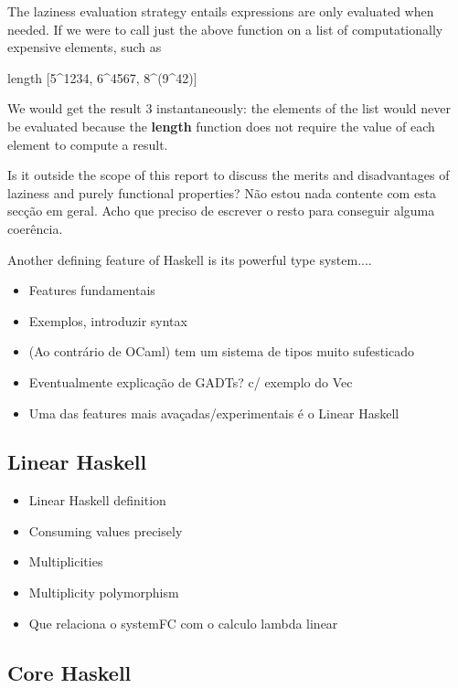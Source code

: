 \documentclass[a4paper, draft]{report}
\begin{document}
The laziness evaluation strategy entails expressions are only evaluated when
needed. If we were to call just the above function on a list of computationally
expensive elements, such as
\begin{code}
    length [5^1234, 6^4567, 8^(9^42)]
\end{code}
We would get the result 3 instantaneously: the elements of the list would never
be evaluated because the \textbf{length} function does not require the value of
each element to compute a result.

Is it outside the scope of this report to discuss the merits and disadvantages
of laziness and purely functional properties? Não estou nada contente com esta
secção em geral. Acho que preciso de escrever o resto para conseguir alguma
coerência.

Another defining feature of Haskell is its powerful type system....


\begin{itemize}
    \item Features fundamentais
    \item Exemplos, introduzir syntax
    \item (Ao contrário de OCaml) tem um sistema de tipos muito sufesticado
    \item Eventualmente explicação de GADTs? c/ exemplo do Vec
    \item Uma das features mais avaçadas/experimentais é o Linear Haskell
\end{itemize}

\subsection{Linear Haskell}

\begin{itemize}
    \item Linear Haskell definition
    \item Consuming values precisely
    \item Multiplicities
    \item Multiplicity polymorphism
    \item Que relaciona o systemFC com o calculo lambda linear
\end{itemize}

\subsection{Core Haskell}
\end{document}
